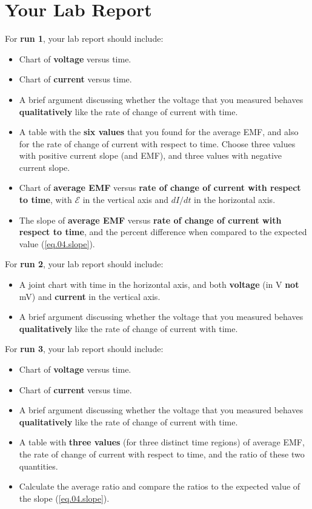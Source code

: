 \section{Your Lab Report}
For \textbf{run 1}, your lab report should include:
\begin{itemize}
	\item Chart of \textbf{voltage} versus time.
	\item Chart of \textbf{current} versus time.
	\item A brief argument discussing whether the voltage that you measured behaves \textbf{qualitatively} like the rate of change of current with time.
	\item A table with the \textbf{six values} that you found for the average EMF, and also for the rate of change of current with respect to time. Choose three values with positive current slope (and EMF), and three values with negative current slope.
	\item Chart of \textbf{average EMF} versus \textbf{rate of change of current with respect to time}, with $\mathcal{E}$ in the vertical axis and $dI/dt$ in the horizontal axis.
	\item The slope of \textbf{average EMF} versus \textbf{rate of change of current with respect to time}, and the percent difference when compared to the expected value (\ref{eq.04.slope}).
\end{itemize}
For \textbf{run 2}, your lab report should include:
\begin{itemize}
	\item A joint chart with time in the horizontal axis, and both \textbf{voltage} (in V \textbf{not} mV) and \textbf{current} in the vertical axis.
	\item A brief argument discussing whether the voltage that you measured behaves \textbf{qualitatively} like the rate of change of current with time.
\end{itemize}
For \textbf{run 3}, your lab report should include:
\begin{itemize}
	\item Chart of \textbf{voltage} versus time.
	\item Chart of \textbf{current} versus time.
	\item A brief argument discussing whether the voltage that you measured behaves \textbf{qualitatively} like the rate of change of current with time.
	\item A table with \textbf{three values} (for three distinct time regions) of average EMF, the rate of change of current with respect to time, and the ratio of these two quantities.
	\item Calculate the average ratio and compare the ratios to the expected value of the slope (\ref{eq.04.slope}).
\end{itemize}
